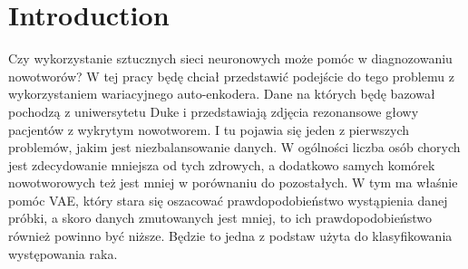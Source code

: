 \chapter{Introduction}

 Czy wykorzystanie sztucznych sieci neuronowych może pomóc w diagnozowaniu nowotworów? W tej pracy będę chciał przedstawić podejście do tego problemu z wykorzystaniem wariacyjnego auto-enkodera. Dane na których będę bazował pochodzą z uniwersytetu Duke i przedstawiają zdjęcia rezonansowe głowy pacjentów z wykrytym nowotworem. I tu pojawia się jeden z pierwszych problemów, jakim jest niezbalansowanie danych. W ogólności liczba osób chorych jest zdecydowanie mniejsza od tych zdrowych, a dodatkowo samych komórek nowotworowych też jest mniej w porównaniu do pozostałych. W tym ma właśnie pomóc VAE, który stara się oszacować prawdopodobieństwo wystąpienia danej próbki, a skoro danych zmutowanych jest mniej, to ich prawdopodobieństwo również powinno być niższe. Będzie to jedna z podstaw użyta do klasyfikowania występowania raka.

